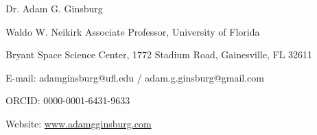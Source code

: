 \begin{center}
{\large Dr. Adam G. Ginsburg}\\
\par Waldo W. Neikirk Associate Professor, University of Florida
\par Bryant Space Science Center,
1772 Stadium Road,
Gainesville, FL 32611
\par E-mail: adamginsburg@ufl.edu / adam.g.ginsburg@gmail.com
\par ORCID: 0000-0001-6431-9633
\par Website: \url{www.adamgginsburg.com}
\end{center}

